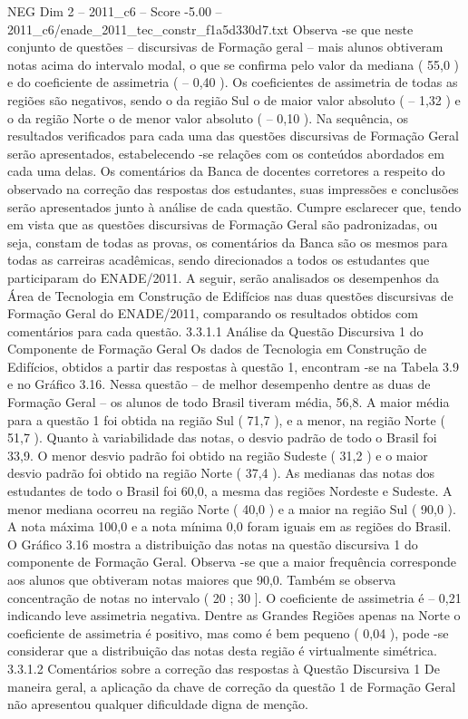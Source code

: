 \begin{textsample}{NEG Dim 2 – 2011\_c6 – Score -5.00 – 2011\_c6/enade\_2011\_tec\_constr\_f1a5d330d7.txt}
Observa -se que neste conjunto de questões – discursivas de Formação geral – mais alunos obtiveram notas acima do intervalo modal, o que se confirma pelo valor da mediana ( 55,0 ) e do coeficiente de assimetria ( – 0,40 ).
Os coeficientes de assimetria de todas as regiões são negativos, sendo o da região Sul o de maior valor absoluto ( – 1,32 ) e o da região Norte o de menor valor absoluto ( – 0,10 ).
Na sequência, os resultados verificados para cada uma das questões discursivas de Formação Geral serão apresentados, estabelecendo -se relações com os conteúdos abordados em cada uma delas.
Os comentários da Banca de docentes corretores a respeito do observado na correção das respostas dos estudantes, suas impressões e conclusões serão apresentados junto à análise de cada questão.
Cumpre esclarecer que, tendo em vista que as questões discursivas de Formação Geral são padronizadas, ou seja, constam de todas as provas, os comentários da Banca são os mesmos para todas as carreiras acadêmicas, sendo direcionados a todos os estudantes que participaram do ENADE/2011.
A seguir, serão analisados os desempenhos da Área de Tecnologia em Construção de Edifícios nas duas questões discursivas de Formação Geral do ENADE/2011, comparando os resultados obtidos com comentários para cada questão. 3.3.1.1 Análise da Questão Discursiva 1 do Componente de Formação Geral Os dados de Tecnologia em Construção de Edifícios, obtidos a partir das respostas à questão 1, encontram -se na Tabela 3.9 e no Gráfico 3.16.
Nessa questão – de melhor desempenho dentre as duas de Formação Geral – os alunos de todo Brasil tiveram média, 56,8.
A maior média para a questão 1 foi obtida na região Sul ( 71,7 ), e a menor, na região Norte ( 51,7 ).
Quanto à variabilidade das notas, o desvio padrão de todo o Brasil foi 33,9.
O menor desvio padrão foi obtido na região Sudeste ( 31,2 ) e o maior desvio padrão foi obtido na região Norte ( 37,4 ).
As medianas das notas dos estudantes de todo o Brasil foi 60,0, a mesma das regiões Nordeste e Sudeste.
A menor mediana ocorreu na região Norte ( 40,0 ) e a maior na região Sul ( 90,0 ).
A nota máxima 100,0 e a nota mínima 0,0 foram iguais em as regiões do Brasil.
O Gráfico 3.16 mostra a distribuição das notas na questão discursiva 1 do componente de Formação Geral.
Observa -se que a maior frequência corresponde aos alunos que obtiveram notas maiores que 90,0.
Também se observa concentração de notas no intervalo ( 20 ; 30 ].
O coeficiente de assimetria é – 0,21 indicando leve assimetria negativa.
Dentre as Grandes Regiões apenas na Norte o coeficiente de assimetria é positivo, mas como é bem pequeno ( 0,04 ), pode -se considerar que a distribuição das notas desta região é virtualmente simétrica. 3.3.1.2 Comentários sobre a correção das respostas à Questão Discursiva 1 De maneira geral, a aplicação da chave de correção da questão 1 de Formação Geral não apresentou qualquer dificuldade digna de menção.

\end{textsample}
